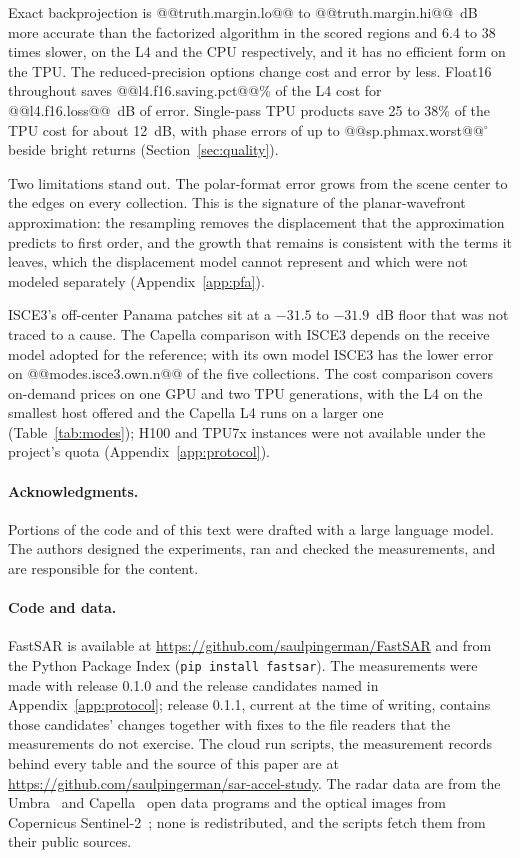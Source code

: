\documentclass[11pt]{article}
\begin{document}
Exact backprojection is @@truth.margin.lo@@ to @@truth.margin.hi@@~dB more accurate than the factorized algorithm in the scored regions and 6.4 to 38 times slower, on the L4 and the CPU respectively, and it has no efficient form on the TPU. The reduced-precision options change cost and error by less. Float16 throughout saves @@l4.f16.saving.pct@@\% of the L4 cost for @@l4.f16.loss@@~dB of error. Single-pass TPU products save 25 to 38\% of the TPU cost for about 12~dB, with phase errors of up to @@sp.phmax.worst@@$^\circ$ beside bright returns (Section~\ref{sec:quality}). 



Two limitations stand out. The polar-format error grows from the scene center to the edges on every collection. This is the signature of the planar-wavefront approximation: the resampling removes the displacement that the approximation predicts to first order, and the growth that remains is consistent with the terms it leaves, which the displacement model cannot represent and which were not modeled separately (Appendix~\ref{app:pfa}).

ISCE3's off-center Panama patches sit at a $-31.5$ to $-31.9$~dB floor that was not traced to a cause. The Capella comparison with ISCE3 depends on the receive model adopted for the reference; with its own model ISCE3 has the lower error on @@modes.isce3.own.n@@ of the five collections. The cost comparison covers on-demand prices on one GPU and two TPU generations, with the L4 on the smallest host offered and the Capella L4 runs on a larger one (Table~\ref{tab:modes}); H100 and TPU7x instances were not available under the project's quota (Appendix~\ref{app:protocol}).

\paragraph{Acknowledgments.} Portions of the code and of this text were drafted with a large language model. The authors designed the experiments, ran and checked the measurements, and are responsible for the content.

\paragraph{Code and data.} FastSAR is available at \url{https://github.com/saulpingerman/FastSAR} and from the Python Package Index (\texttt{pip install fastsar}). The measurements were made with release 0.1.0 and the release candidates named in Appendix~\ref{app:protocol}; release 0.1.1, current at the time of writing, contains those candidates' changes together with fixes to the file readers that the measurements do not exercise. The cloud run scripts, the measurement records behind every table and the source of this paper are at \url{https://github.com/saulpingerman/sar-accel-study}. The radar data are from the Umbra~\cite{umbra2023} and Capella~\cite{capella2023} open data programs and the optical images from Copernicus Sentinel-2~\cite{sentinel2}; none is redistributed, and the scripts fetch them from their public sources.
\end{document}
